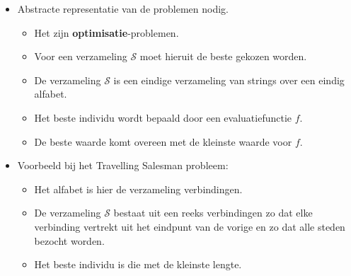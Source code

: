 \begin{itemize}
    \item Abstracte representatie van de problemen nodig. 
    \begin{itemize}
        \item Het zijn \textbf{optimisatie}-problemen.
        \item Voor een verzameling $\mathcal{S}$ moet hieruit de beste gekozen worden.
        \item De verzameling $\mathcal{S}$ is een eindige verzameling van strings over een eindig alfabet.
        \item Het beste individu wordt bepaald door een evaluatiefunctie $f$.
        \item De beste waarde komt overeen met de kleinste waarde voor $f$.
    \end{itemize}
    \item Voorbeeld bij het Travelling Salesman probleem:
    \begin{itemize}
        \item Het alfabet is hier de verzameling verbindingen.
        \item De verzameling $\mathcal{S}$ bestaat uit een reeks verbindingen zo dat elke verbinding vertrekt uit het eindpunt van de vorige en zo dat alle steden bezocht worden.
        \item Het beste individu is die met de kleinste lengte.
    \end{itemize}


\end{itemize}
